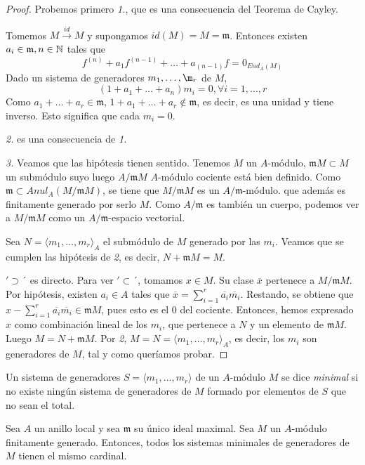 \documentclass[../main.tex]{subfiles}
\begin{document}
\begin{proof}
Probemos primero \textit{1.}, que es una consecuencia del Teorema de Cayley.

Tomemos $M\overset{id}{\longrightarrow}M$ y supongamos $id(M)=M=\mathfrak{m}$. Entonces existen $a_i\in\mathfrak{m},n\in\mathbb{N}$ tales que $$f^{(n)}+a_1f^{(n-1)}+\dots+a_{(n-1)}f=0_{End_A(M)}$$ Dado un sistema de generadores $m_1,\dots,\m_r$ de $M$, $$(1+a_1+\dots+a_n)m_i=0, \forall i=1,\dots,r$$ Como $a_1+\dots+a_r\in\mathfrak{m}$, $1+a_1+\dots+a_r\notin\mathfrak{m}$, es decir, es una unidad y tiene inverso. Esto significa que cada $m_i=0$.

\textit{2.} es una consecuencia de \textit{1.}

\textit{3.} Veamos que las hipótesis tienen sentido. Tenemos $M$ un $A$-módulo, $\mathfrak{m}M\subset M$ un submódulo suyo luego $A/\mathfrak{m}M$ $A$-módulo cociente está bien definido. Como $\mathfrak{m}\subset Anul_A(M/\mathfrak{m}M)$, se tiene que $M/\mathfrak{m}M$ es un $A/\mathfrak{m}$-módulo. que además es finitamente generado por serlo $M$. Como $A/\mathfrak{m}$ es también un cuerpo, podemos ver a $M/\mathfrak{m}M$ como un $A/\mathfrak{m}$-espacio vectorial.

Sea $N=\langle m_1,\dots,m_r\rangle_A$ el submódulo de $M$ generado por las $m_i$. Veamos que se cumplen las hipótesis de \textit{2}, es decir, $N+\mathfrak{m}M=M$.

$'\supset´$ es directo. Para ver $'\subset´$, tomamos $x\in M$. Su clase $\overline{x}$ pertenece a $M/\mathfrak{m}M$. Por hipótesis, existen $a_i\in A$ tales que $\overline{x}=\sum_{i=1}^{r}\overline{a_i}\overline{m_i}$. Restando, se obtiene que $x-\sum_{i=1}^{r}\overline{a_i}\overline{m_i}\in\mathfrak{m}M$, pues esto es el $0$ del cociente. Entonces, hemos expresado $x$ como combinación lineal de los $m_i$, que pertenece a $N$ y un elemento de $\mathfrak{m}M$. Luego $M=N+\mathfrak{m}M$. Por \textit{2}, $M=N=\langle m_1,\dots,m_r\rangle_A$, es decir, los $m_i$ son generadores de $M$, tal y como queríamos probar.
\end{proof}
\begin{definition}
Un sistema de generadores $S=\langle m_1,\dots,m_r\rangle$ de un $A$-módulo $M$ se dice \textit{minimal} si no existe ningún sistema de generadores de $M$ formado por elementos de $S$ que no sean el total.
\end{definition}
\begin{corollary}
Sea $A$ un anillo local y sea $\mathfrak{m}$ su único ideal maximal. Sea $M$ un $A$-módulo finitamente generado. Entonces, todos los sistemas minimales de generadores de $M$ tienen el mismo cardinal.
\end{corollary}
\end{document}
